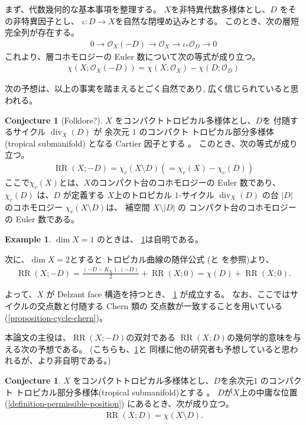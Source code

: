 \documentclass[a4paper,dvipdfmx,reqno,12pt]{amsart}
\theoremstyle{definition}
\newtheorem{example}[theorem]{Example}
\newtheorem{conjecture}[theorem]{Conjecture}
\newcommand{\opn}[1]{\operatorname{#1}}
\numberwithin{equation}{section}
\begin{document}
まず、代数幾何的な基本事項を整理する。
$X$を非特異代数多様体とし、$D$ をその非特異因子とし、
$\iota\colon D\to X$を自然な閉埋め込みとする。
このとき、次の層短完全列が存在する。
\begin{align}
     0\to \mathcal{O}_X(-D)\to 
\mathcal{O}_X\to \iota_*\mathcal{O}_D\to 0
\end{align}
これより、層コホモロジーの Euler 数について次の等式が成り立つ。
\begin{align}
\label{equation-anti-effective-divisor}
\chi(X;\mathcal{O}_X(-D))=\chi(X;\mathcal{O}_X)
-\chi(D;\mathcal{O}_D)
\end{align}

次の予想は、以上の事実を踏まえるとごく自然であり,
広く信じられていると思われる。

\begin{conjecture}[{Folklore?}]
\label{conjecture-rr-c-euler}
$X$ をコンパクトトロピカル多様体とし、$D$を
付随するサイクル $\opn{div}_X(D)$ が
余次元 $1$
のコンパクト
トロピカル部分多様体(tropical submanifold)
となる Cartier 因子とする
\cite[Definition 2.14]{demedrano2023chern}。
このとき、次の等式が成り立つ。
\begin{align}
\opn{RR}(X;-D)=
\chi_c (X\setminus D) (=\chi_c (X)-\chi_c(D))
\end{align}
ここで$\chi_c(X)$とは、$X$のコンパクト台のコホモロジーの
Euler 数であり、
$\chi_c(D)$ は、$D$ が定義する
$X$上のトロピカル $1$-サイクル $\opn{div}_X(D)$
の台 $|D|$ のコホモロジー
$\chi_c(X\setminus D)$は、
補空間 $X\setminus |D|$ の コンパクト台のコホモロジーの
Euler 数である。
\end{conjecture}

\begin{example}
$\dim X=1$ のときは、
\cref{conjecture-rr-c-euler}は自明である。

次に、$\dim X=2$とすると
トロピカル曲線の随伴公式
(\cite[Theorem 6]{shaw2015tropical}と
\cite[Theorem 5.2]{demedrano2023chern}を参照)より、
\begin{align}
\opn{RR}(X;-D)=\frac{(-D-K_X).(-D)}{2}+\opn{RR}(X;0)
=\chi(D)+\opn{RR}(X;0).
\end{align}

よって、$X$ が Delzant face 構造を持つとき、
\cref{conjecture-rr-c-euler} が成立する。
なお、ここではサイクルの交点数と付随する Chern 類の
交点数が一致することを用いている
(\cref{proposition-cycle-chern})。
\end{example}
本論文の主役は、$\opn{RR}(X;-D)$の双対である
$\opn{RR}(X;D)$の幾何学的意味を与える次の予想である。
(こちらも、\cref{conjecture-rr-c-euler}と
同様に他の研究者も予想していると思われるが、より非自明である。)
\begin{conjecture}
\label{conjecture-rr-euler}
$X$ をコンパクトトロピカル多様体とし、$D$を余次元$1$
のコンパクト
トロピカル部分多様体(tropical submanifold)とする
\cite[Definition 2.14]{demedrano2023chern}。
$D$が$X$上の中庸な位置
(\cref{definition-permissible-position})
にあるとき、次が成り立つ。
\begin{align}
\opn{RR}(X;D)=\chi(X\setminus D).
\end{align}
\end{conjecture}
\end{document}

